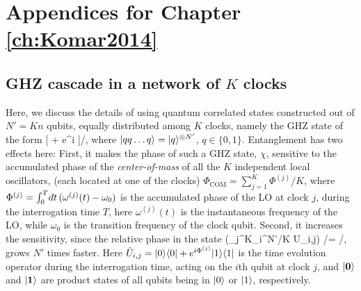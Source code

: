 \chapter{Appendices for Chapter \ref{ch:Komar2014}}
\label{app:Komar2014}



\section{GHZ cascade in a network of $K$ clocks}
Here, we discuss the details of using quantum correlated
states constructed out of $N' = Kn$ qubits, equally distributed among $K$
clocks, namely the GHZ state of the form
\bel
	\label{eq:GHZ}
	[ + e^{i\chi} ]/,
\eel
where $| qq\dots q \rangle = | q \rangle^{\otimes N'}$, $q\in\{0,1\}$. Entanglement has
two effects here: First, it makes the phase of such a GHZ state, $\chi$,
sensitive to the accumulated phase of the \emph{center-of-mass} of all the $K$
independent local oscillators, (each located at one of the clocks)
$\Phi_\mathrm{COM} =
\sum_{j=1}^K \Phi^{(j)} /K$, where $\Phi^{(j)} = \intop_0^T\d{t}
(\omega^{(j)}(t) - \omega_0)$ is the accumulated phase of the LO at clock $j$,
during the interrogation time $T$, here $\omega^{(j)}(t)$ is the instantaneous
frequency of the LO, while $\omega_0$ is the transition frequency of the clock
qubit. Second, it increases the sensitivity, since the relative phase in
the state
\bel
\label{eq:GHZ_evolved}
	\left(\prod_{j}^{K}\prod_i^{N'/K} \hat U_{i,j}\right) /= 
	/,
\eel
grows $N'$ times faster.
Here $\hat U_{i,j} = | 0 \rangle\langle 0 | + e^{i\Phi^{(j)}}| 1 \rangle\langle 1 |$ is the time
evolution operator during the interrogation time, acting on the $i$th qubit at
clock $j$, and $| \mathbf{0} \rangle$ and $| \mathbf{1} \rangle$ are product states of
all qubits being in $| 0 \rangle$ or $| 1 \rangle$, respectively.

